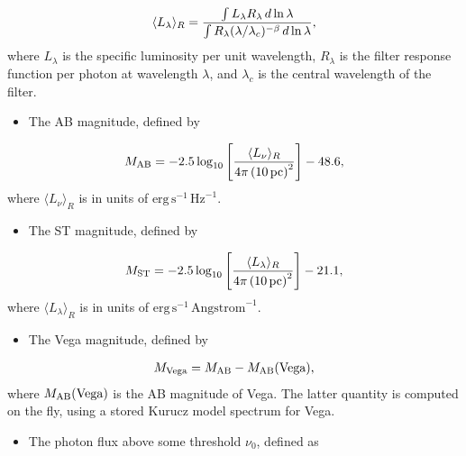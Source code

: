 \documentclass[letterpaper,10pt,english]{sphinxmanual}
\begin{document}
\begin{gather}
\begin{split}\langle L_\lambda\rangle_R = \frac{\int L_\lambda R_\lambda \, d\ln\lambda}{\int R_\lambda (\lambda/\lambda_c)^{-\beta} \, d\ln\lambda},\end{split}\notag
\end{gather}
where \(L_\lambda\) is the specific luminosity per unit wavelength, \(R_\lambda\) is the filter response function per photon at wavelength \(\lambda\), and \(\lambda_c\) is the central wavelength of the filter.
\begin{itemize}
\item {} 
The AB magnitude, defined by

\end{itemize}
\begin{gather}
\begin{split}M_{\rm AB} = -2.5 \log_{10} \left[\frac{\langle L_\nu\rangle_R}{4\pi\left(10\,\mathrm{pc}\right)^2}\right] - 48.6,\end{split}\notag
\end{gather}
where \(\langle L_\nu\rangle_R\) is in units of \(\mathrm{erg\,s}^{-1}\,\mathrm{Hz}^{-1}\).
\begin{itemize}
\item {} 
The ST magnitude, defined by

\end{itemize}
\begin{gather}
\begin{split}M_{\rm ST} = -2.5 \log_{10} \left[\frac{\langle L_\lambda\rangle_R}{4\pi\left(10\,\mathrm{pc}\right)^2}\right] - 21.1,\end{split}\notag
\end{gather}
where \(\langle L_\lambda\rangle_R\) is in units of \(\mathrm{erg\, s}^{-1}\,\mathrm{Angstrom}^{-1}\).
\begin{itemize}
\item {} 
The Vega magnitude, defined by

\end{itemize}
\begin{gather}
\begin{split}M_{\rm Vega} = M_{\rm AB} - M_{\rm AB}(\mbox{Vega}),\end{split}\notag
\end{gather}
where \(M_{\rm AB}(\mbox{Vega})\) is the AB magnitude of Vega. The latter quantity is computed on the fly, using a stored Kurucz model spectrum for Vega.
\begin{itemize}
\item {} 
The photon flux above some threshold \(\nu_0\), defined as

\end{itemize}
\end{document}
